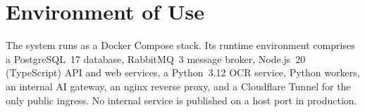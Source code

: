 \section{Environment of Use}

\noindent The system runs as a Docker Compose stack. Its runtime environment
comprises a PostgreSQL~17 database, RabbitMQ~3 message broker, Node.js~20
(TypeScript) API and web services, a Python~3.12 OCR service, Python workers, an
internal AI gateway, an nginx reverse proxy, and a Cloudflare Tunnel for the
only public ingress. No internal service is published on a host port in
production.